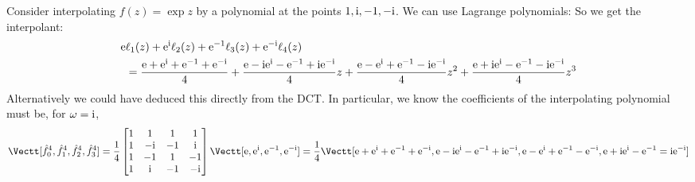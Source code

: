 \begin{example} Consider interpolating $f(z) = \exp z$ by a polynomial at the points $1, {\rm i}, -1, -{\rm i}$. We can use Lagrange polynomials:
So we get the interpolant:
\begin{align*}
{\rm e} & \ell_1(z) + {\rm e}^{\rm i} \ell_2(z) + {\rm e}^{-1} \ell_3(z) + {\rm e}^{-{\rm i}} \ell_4(z) \\
 &= 
{{\rm e} + {\rm e}^{\rm i} + {\rm e}^{-1} + {\rm e}^{-{\rm i}} \over 4} +
{{\rm e} - {\rm i} {\rm e}^{\rm i} - {\rm e}^{-1} + {\rm i} {\rm e}^{-{\rm i}} \over 4} z +
 {{\rm e} - {\rm e}^{\rm i} + {\rm e}^{-1} - {\rm i} {\rm e}^{-{\rm i}} \over 4} z^2 +
 {{\rm e} + {\rm i} {\rm e}^{\rm i} - {\rm e}^{-1} - {\rm i} {\rm e}^{-{\rm i}} \over 4} z^3 
\end{align*}
Alternatively we could have deduced this directly from the DCT. In particular, we know the coefficients of the interpolating polynomial must be, for $\omega = {\rm i}$,
\[
\Vectt[\hat f_0^4, \hat f_1^4, \hat f_2^4, \hat f_3^4] = 
{1 \over 4} \begin{bmatrix}1 & 1 & 1 & 1 \\
                            1 & -\I & -1 & \I \\
                            1 & -1 & 1 & -1 \\
                            1 & \I & -1 & -\I
                            \end{bmatrix}
 \Vectt[\E, \E^\I, \E^{-1}, \E^{-\I}] = {1 \over 4} \Vectt[\E + \E^\I + \E^{-1} + \E^{-\I} ,
 \E -\I \E^\I - \E^{-1} + \I \E^{-\I} ,
 \E - \E^\I + \E^{-1} - \E^{-\I} ,
 \E + \I \E^\I - \E^{-1} = \I \E^{-\I}
 ]
\]
\end{example}



